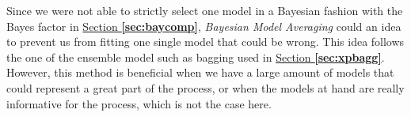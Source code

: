 Since we were not able to strictly select one model in a Bayesian fashion with the Bayes factor in \hyperref[sec:baycomp]{Section \textbf{\ref{sec:baycomp}}}, \emph{Bayesian Model Averaging} could an idea to prevent us from fitting one single model that could be wrong.
This idea follows the one of the ensemble model such as bagging used in \hyperref[sec:xpbagg]{Section \textbf{\ref{sec:xpbagg}}}. However, this method is beneficial when we have a large amount of models that could represent a great part of the process, or when the models at hand are really informative for the process, which is not the case here.



